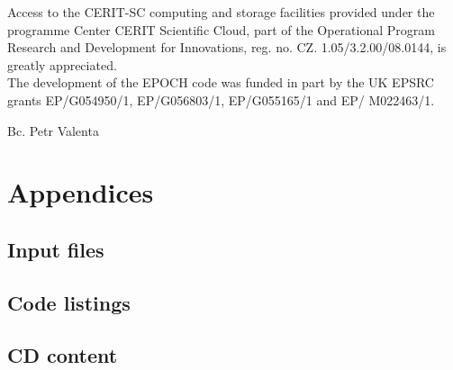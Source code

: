 \documentclass[12pt, twoside, a4paper, openright]{report}
\newcommand{\valenta}{Bc. Petr Valenta }
\begin{document}
Access to the CERIT-SC computing and storage facilities provided under the programme Center CERIT Scientific Cloud, part of the Operational Program Research and Development for Innovations, reg. no. CZ. 1.05/3.2.00/08.0144, is greatly  appreciated.\\

The development of the EPOCH code was funded in part by the UK EPSRC grants EP/G054950/1, EP/G056803/1, EP/G055165/1 and EP/ M022463/1.\\
\begin{flushright}
\valenta
\end{flushright}


\newpage
{}




\part*{Appendices}

\appendix

\chapter{Input files}


\chapter{Code listings}


\chapter{CD content}

\end{document}
